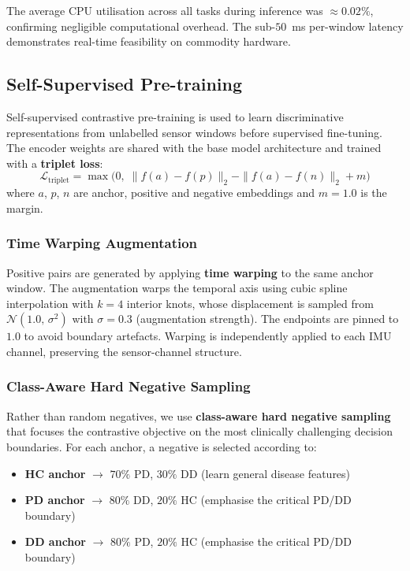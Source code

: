 \documentclass[conference]{IEEEtran}
\begin{document}
\noindent The average CPU utilisation across all tasks during inference was $\approx 0.02\%$, confirming negligible computational overhead. The sub-$50$~ms per-window latency demonstrates real-time feasibility on commodity hardware.


\subsection{Self-Supervised Pre-training}

Self-supervised contrastive pre-training is used to learn discriminative representations from unlabelled sensor windows before supervised fine-tuning. The encoder weights are shared with the base model architecture and trained with a \textbf{triplet loss}:
\begin{equation}
\mathcal{L}_{\text{triplet}} = \max\bigl(0,\; \|f(a){-}f(p)\|_2 - \|f(a){-}f(n)\|_2 + m\bigr)
\end{equation}
where $a$, $p$, $n$ are anchor, positive and negative embeddings and $m{=}1.0$ is the margin.

\subsubsection{Time Warping Augmentation}

Positive pairs are generated by applying \textbf{time warping} to the same anchor window. The augmentation warps the temporal axis using cubic spline interpolation with $k{=}4$ interior knots, whose displacement is sampled from $\mathcal{N}(1.0,\,\sigma^2)$ with $\sigma{=}0.3$ (augmentation strength). The endpoints are pinned to $1.0$ to avoid boundary artefacts. Warping is independently applied to each IMU channel, preserving the sensor-channel structure.

\subsubsection{Class-Aware Hard Negative Sampling}

Rather than random negatives, we use \textbf{class-aware hard negative sampling} that focuses the contrastive objective on the most clinically challenging decision boundaries. For each anchor, a negative is selected according to:

\begin{itemize}[noitemsep]
  \item \textbf{HC anchor} $\rightarrow$ $70\%$ PD, $30\%$ DD (learn general disease features)
  \item \textbf{PD anchor} $\rightarrow$ $80\%$ DD, $20\%$ HC (emphasise the critical PD/DD boundary)
  \item \textbf{DD anchor} $\rightarrow$ $80\%$ PD, $20\%$ HC (emphasise the critical PD/DD boundary)
\end{itemize}
\end{document}
